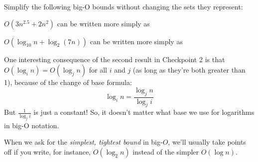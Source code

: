 
Simplify the following big-O bounds without changing the sets they
represent:

\smallskip
$O(3n^{2.5} + 2n^2)$ can be written more simply as

\smallskip
$O(\log_{10} n + \log_{2}(7n))$ can be written more simply as

\bigskip
One interesting consequence of the second result in Checkpoint 2 is that
$O(\log_i n) = O(\log_j n)$ for all $i$ and $j$ (as long as they're both
greater than 1), because of the change of base formula:
$$
\log_i n = \frac{\log_j n}{\log_j i}
$$
But $\frac{1}{\log_j i}$ is just a constant! So,
it doesn't matter what base we use for logarithms in big-O notation.

When we ask for the \emph{simplest, tightest bound} in big-$O$, we'll usually
take points off if you write, for instance, $O(\log_2 n)$ instead of the simpler
$O(\log n)$.
